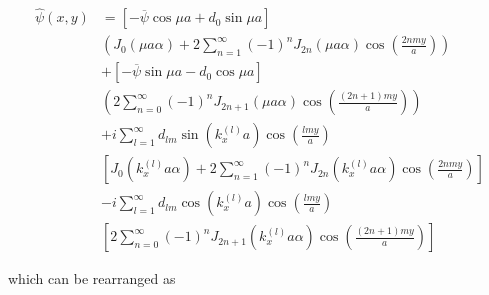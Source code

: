 \documentclass{article}
\begin{document}
\begin{equation}
    \begin{split}
        \hat{\psi}(x,y) &= \left[-\overline{\psi}\cos{\mu a} + d_0\sin{\mu a} \right] \\
                        &\left( J_0\left( \mu a \alpha \right) + 2 \sum_{n=1}^{\infty} (-1)^n J_{2n} \left( \mu a \alpha \right) \cos\left( \frac{2nmy}{a} \right) \right) \\
                        &+ \left[-\overline{\psi}\sin{\mu a} - d_0\cos{\mu a} \right] \\
                        &\left( 2\sum_{n=0}^{\infty}(-1)^{n}J_{2n+1}\left(\mu a \alpha \right)\cos\left( \frac{(2n+1)my}{a}\right) \right) \\
                        &+i \sum_{l=1}^{\infty} d_{lm}\sin\left( k_x^{(l)} a \right) \cos\left( \frac{lmy}{a} \right) \\
                        &\left[ J_0\left( k_x^{(l)} a \alpha \right) + 2 \sum_{n=1}^{\infty} (-1)^n J_{2n} \left( k_x^{(l)} a \alpha \right) \cos\left( \frac{2nmy}{a} \right) \right] \\
                        &-i \sum_{l=1}^{\infty} d_{lm}\cos\left( k_x^{(l)} a \right) \cos\left( \frac{lmy}{a} \right) \\
                        &\left[ 2\sum_{n=0}^{\infty}(-1)^{n}J_{2n+1}\left( k_x^{(l)  } a \alpha \right)\cos\left( \frac{(2n+1)my}{a}\right) \right]
    \end{split}
\end{equation} 

\newpage
which can be rearranged as
\end{document}
